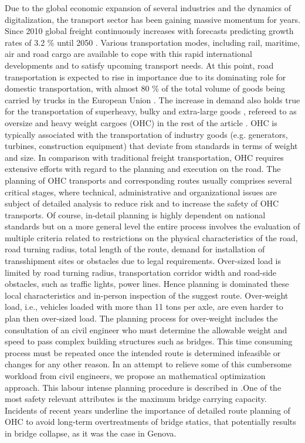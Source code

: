 
Due to the global economic expansion of several industries and the dynamics of digitalization, the transport sector has been gaining massive momentum for years. Since 2010 global freight continuously increases with forecasts predicting growth rates of 3.2 \% until 2050 \cite{figura2020preferences, InternationalTransportForum}. Various transportation modes, including rail, maritime, air and road cargo are available to cope with this rapid international developments and to satisfy upcoming transport needs. At this point, road transportation is expected to rise in importance due to its dominating role for domestic transportation, with almost 80 \% of the total volume of goods being carried by trucks in the European Union \cite{Eurostat}. The increase in demand also holds true for the transportation of superheavy, bulky and extra-large goods \cite{gavrilova2021analysis}, refereed to as oversize and heavy weight cargoes (OHC) in the rest of the article \cite{Luo.2021}. OHC is typically associated with the transportation of industry goods (e.g. generators, turbines, construction equipment) that deviate from standards in terms of weight and size. In comparison with traditional freight transportation, OHC requires extensive efforts with regard to the planning and execution on the road. The planning of OHC transports and corresponding routes usually comprises several critical stages, where technical, administrative and organizational issues are subject of detailed analysis to reduce risk and to increase the safety of OHC transports. Of course, in-detail planning is highly dependent on national standards but on a more general level the entire process involves the evaluation of multiple criteria related to restrictions on the physical characteristics of the road, road turning radius, total length of the route, demand for installation of transshipment sites or obstacles due to legal requirements. Over-sized load is limited by road turning radius, transportation corridor width and road-side obstacles, such as traffic lights, power lines. Hence planning is dominated these local characteristics and in-person inspection of the suggest route. Over-weight load, i.e., vehicles loaded with more than 11 tons per axle, are even harder to plan then over-sized load. The planning process for over-weight includes the consultation of an civil engineer who must determine the allowable weight and speed to pass complex building structures such as bridges. This time consuming process must be repeated once the intended route is determined infeasible or changes for any other reason. In an attempt to relieve some of this cumbersome workload from civil engineers, we propose an mathematical optimization approach. This labour intense planning procedure is described in \citet{Osegueda.1999}.One of the most safety relevant attributes is the maximum bridge carrying capacity. Incidents of recent years underline the importance of detailed route planning of OHC to avoid long-term overtreatments of bridge statics, that potentially results in bridge collapse, as it was the case in Genova.


